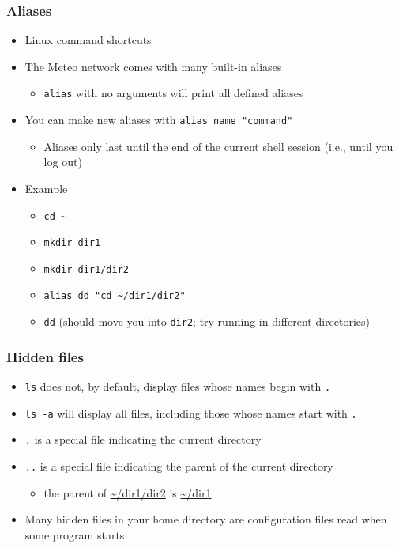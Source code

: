 \documentclass[hyperref,pdfa,unicode,utf8,usepdftitle]{beamer}
\begin{document}
\begin{frame}
  \frametitle{Aliases}
  \begin{itemize}
  \item Linux command shortcuts
  \item The Meteo network comes with many built-in aliases
    \begin{itemize}
    \item \lstinline{alias} with no arguments will print all defined
      aliases
    \end{itemize}
  \item You can make new aliases with \lstinline{alias name "command"}
    \begin{itemize}
    \item Aliases only last until the end of the current shell session
      (i.e., until you log out)
    \end{itemize}
  \item Example
    \begin{itemize}
    \item \lstinline{cd ~}
    \item \lstinline{mkdir dir1}
    \item \lstinline{mkdir dir1/dir2}
    \item \lstinline{alias dd "cd ~/dir1/dir2"}
    \item \lstinline{dd} (should move you into \lstinline{dir2}; try
      running in different directories)
    \end{itemize}
  \end{itemize}
\end{frame}

\begin{frame}
  \frametitle{Hidden files}
  \begin{itemize}
  \item \lstinline{ls} does not, by default, display files whose names
    begin with \lstinline{.}
  \item \lstinline{ls -a} will display all files, including those
    whose names start with \lstinline{.}
  \item \lstinline{.} is a special file indicating the current
    directory
  \item \lstinline{..} is a special file indicating the parent of the
    current directory
    \begin{itemize}
    \item the parent of \url{~/dir1/dir2} is \url{~/dir1}
    \end{itemize}
  \item Many hidden files in your home directory are configuration
    files read when some program starts
  \end{itemize}
\end{frame}
\end{document}
